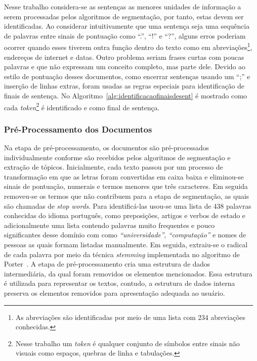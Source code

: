 Nesse trabalho considera-se as sentenças as menores unidades de informação a serem processadas pelos algoritmos de segmentação, por tanto, estas devem ser identificadas. Ao considerar intuitivamente que uma sentença seja uma sequência de palavras entre sinais de pontuação como ``.'', ``!'' e ``?'', alguns erros poderiam ocorrer quando esses tiverem outra função dentro do texto como em abreviações\footnote{As abreviações são identificadas por meio de uma lista com 234 abreviações conhecidas.}, endereços de internet e datas. Outro problema seriam frases curtas com poucas palavras e que não expressam um conceito completo, mas parte dele. Devido ao estilo de pontuação desses documentos, como encerrar sentenças usando um ``;'' e inserção de linhas extras, foram usadas as regras especiais para identificação de finais de sentença. No Algoritmo~\ref{alg:identificacaofinaisdesent} é mostrado como cada \textit{token}\footnote{Nesse trabalho um \textit{token} é qualquer conjunto de símbolos entre sinais não visuais como espaços, quebras de linha e tabulações.} é identificado e como final de sentença.  %







\subsubsection{Pré-Processamento dos Documentos}



Na etapa de pré-processamento, os documentos são pré-processados individualmente conforme são recebidos pelos algoritmos de segmentação e extração de tópicos. Inicialmente, cada texto passou por um processo de transformação em que as letras foram convertidas em caixa baixa e eliminou-se sinais de pontuação, numerais e termos menores que três caracteres. Em seguida removeu-se os termos que não contribuem para a etapa de segmentação, as quais são chamadas de \textit{stop words}. Para identificá-las usou-se uma lista de 438 palavras conhecidas do idioma português, como preposições, artigos e verbos de estado e adicionalmente uma lista contendo palavras muito frequentes e pouco significantes desse domínio com como \textit{``universidade''}, \textit{``computação''} e nomes de pessoas as quais formam listadas manualmente. Em seguida, extraiu-se o radical de cada palavra por meio da técnica \textit{stemming} implementada no algoritmo de Porter~\cite{Porter1997}. A etapa de pré-processamento cria uma estrutura de dados intermediária, da qual foram removidos os elementos mencionados. Essa estrutura é utilizada para representar os textos, contudo, a estrutura de dados interna preserva os elementos removidos para apresentação adequada ao usuário.
 
